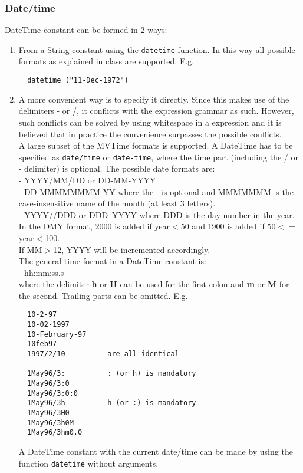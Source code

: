 \begin{itemize}
\subsubsection{\label{TAQL:DATETIMECONST}Date/time}
  DateTime constant can be formed in 2 ways:
  \begin{enumerate}
  \item From a String constant using the \texttt{datetime} function.
    In this way all possible formats as explained in class
    are supported. E.g.
\begin{verbatim}
  datetime ("11-Dec-1972")
\end{verbatim}
  \item A more convenient way is to specify it directly. Since this
    makes use of the delimiters - or /, it conflicts with the
    expression grammar as such. However, such conflicts can be
    solved by using whitespace in a expression and it is believed
    that in practice the convenience surpasses the possible
    conflicts.
    \\A large subset of the MVTime formats is supported.
    A DateTime has to be specified as \texttt{date/time}
    or \texttt{date-time}, where the time part (including
    the / or - delimiter) is optional.
    The possible date formats are:
    \\- YYYY/MM/DD or DD-MM-YYYY
    \\- DD-MMMMMMMM-YY where the - is optional and MMMMMMM is the
    case-insensitive name of the month (at least 3 letters).
    \\- YYYY//DDD or DDD--YYYY where DDD is the day number in
    the year.
    \\In the DMY format, 2000 is added if year$<$50 and
    1900 is added if 50$<=$year$<$100.
    \\If MM$>$12, YYYY will be incremented accordingly.
    \\The general time format in a DateTime constant is:
    \\- hh:mm:ss.s
    \\where the delimiter \textbf{h} or \textbf{H} can be used
    for the first colon and \textbf{m} or \textbf{M} for the second.
    Trailing parts can be omitted. E.g.
\begin{verbatim}
  10-2-97
  10-02-1997
  10-February-97
  10feb97
  1997/2/10          are all identical

  1May96/3:          : (or h) is mandatory
  1May96/3:0
  1May96/3:0:0
  1May96/3h          h (or :) is mandatory
  1May96/3H0
  1May96/3h0M
  1May96/3hm0.0
\end{verbatim}
    A DateTime constant with the current date/time can be made
    by using the function \texttt{datetime} without arguments.
  \end{enumerate}
\end{itemize}

